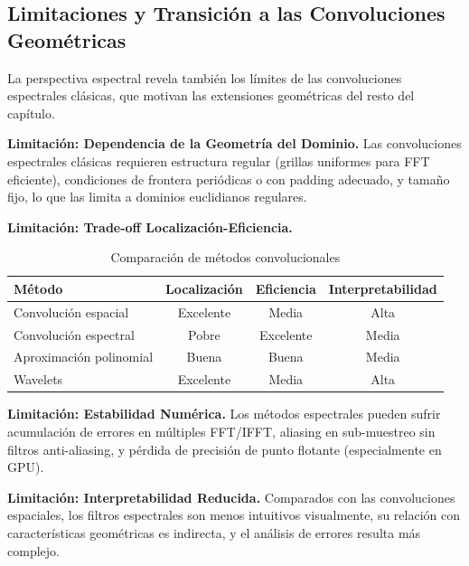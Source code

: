 \subsection{Limitaciones y Transición a las Convoluciones Geométricas}\label{subsec:aplicaciones_limitaciones}

La perspectiva espectral revela también los límites de las convoluciones espectrales clásicas, que motivan las extensiones geométricas del resto del capítulo.

\textbf{Limitación: Dependencia de la Geometría del Dominio.}\label{lim:geometria_dominio} Las convoluciones espectrales clásicas requieren estructura regular (grillas uniformes para \gls{FFT} eficiente), condiciones de frontera periódicas o con padding adecuado, y tamaño fijo, lo que las limita a dominios euclidianos regulares.

\textbf{Limitación: Trade-off Localización-Eficiencia.}\label{lim:tradeoff_localizacion}
\begin{table}[h]
\centering
\begin{tabular}{|l|c|c|c|}
\hline
\textbf{Método} & \textbf{Localización} & \textbf{Eficiencia} & \textbf{Interpretabilidad} \\
\hline
Convolución espacial & Excelente & Media & Alta \\
Convolución espectral & Pobre & Excelente & Media \\
Aproximación polinomial & Buena & Buena & Media \\
Wavelets & Excelente & Media & Alta \\
\hline
\end{tabular}
\caption{Comparación de métodos convolucionales}
\label{tab:comparacion_metodos}
\end{table}

\textbf{Limitación: Estabilidad Numérica.}\label{lim:estabilidad_numerica} Los métodos espectrales pueden sufrir acumulación de errores en múltiples \gls{FFT}/IFFT, aliasing en sub-muestreo sin filtros anti-aliasing, y pérdida de precisión de punto flotante (especialmente en GPU).

\textbf{Limitación: Interpretabilidad Reducida.}\label{lim:interpretabilidad} Comparados con las convoluciones espaciales, los filtros espectrales son menos intuitivos visualmente, su relación con características geométricas es indirecta, y el análisis de errores resulta más complejo.

